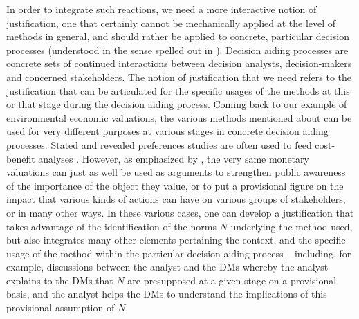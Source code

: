 \documentclass[preprint, french, english, 11pt, authoryear]{elsarticle}%
\begin{document}
In order to integrate such reactions, we need a more interactive notion of justification, one that certainly cannot be mechanically applied at the level of methods in general, and should rather be applied to concrete, particular decision processes (understood in the sense spelled out in \citep{tsoukias_concept_2007}). Decision aiding processes are concrete sets of continued interactions between decision analysts, decision-makers and concerned stakeholders. The notion of justification that we need refers to the justification that can be articulated for the specific usages of the methods at this or that stage during the decision aiding process. Coming back to our example of environmental economic valuations, the various methods mentioned about can be used for very different purposes at various stages in concrete decision aiding processes. Stated and revealed preferences studies are often used to feed cost-benefit analyses \citep{layard_cost-benefit_1994}. However, as emphasized by \citep{meinard_ethical_2016}, the very same monetary valuations can just as well be used as arguments to strengthen public awareness of the importance of the object they value, or to put a provisional figure on the impact that various kinds of actions can have on various groups of stakeholders, or in many other ways. In these various cases, one can develop a justification that takes advantage of the identification of the norms $N$ underlying the method used, but also integrates many other elements pertaining the context, and the specific usage of the method within the particular decision aiding process -- including, for example, discussions between the analyst and the \acp{DM} whereby the analyst explains to the \acp{DM} that $N$ are presupposed at a given stage on a provisional basis, and the analyst helps the \acp{DM} to understand the implications of this provisional assumption of $N$.
\end{document}
